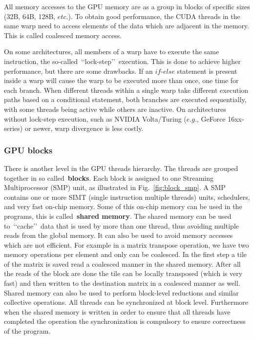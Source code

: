 \par
All memory accesses to the GPU memory are as a group in blocks of specific sizes (32B, 64B, 128B, $etc.$).
To obtain good performance, the CUDA threads in the same warp need to access elements of the data which are adjacent in the memory. 
This is called coalesced memory access.


\par
On some architectures, all members of a warp have to execute the same instruction, the so-called~\lq\lq lock-step\rq\rq~execution. 
This is done to achieve higher performance, but there are some drawbacks.
If an $if$-$else$ statement is present inside a warp will cause the warp to be executed more than once, one time for each branch.
When different threads within a single warp take different execution paths based on a conditional statement, both branches are executed sequentially, with some threads being active while others are inactive.
On architectures without lock-step execution, such as NVIDIA Volta/Turing ($e.g.$, GeForce 16xx-series) or newer, warp divergence is less costly.


\subsubsection{GPU blocks}


\par
There is another level in the GPU threads hierarchy. The threads are grouped together in so called~\textbf{blocks}.
Each block is assigned to one Streaming Multiprocessor (SMP) unit, as illustrated in Fig.~\ref{fig:block_smp}.
A SMP contains one or more SIMT (single instruction multiple threads) units, schedulers, and very fast on-chip memory.
Some of this on-chip memory can be used in the programs, this is called~\textbf{shared memory}.
The shared memory can be used to~\lq\lq cache\rq\rq~data that is used by more than one thread, thus avoiding multiple reads from the global memory.
It can also be used to avoid memory accesses which are not efficient.
For example in a matrix transpose operation, we have two memory operations per element and only can be coalesced.
In the first step a tile of the matrix is saved read a coalesced manner in the shared memory.
After all the reads of the block are done the tile can be locally transposed (which is very fast) and then written to the destination matrix in a coalesced manner as well.
Shared memory can also be used to perform block-level reductions and similar collective operations.
All threads can be synchronized at block level.
Furthermore when the shared memory is written in order to ensure that all threads have completed the operation the synchronization is compulsory to ensure correctness of the program.


